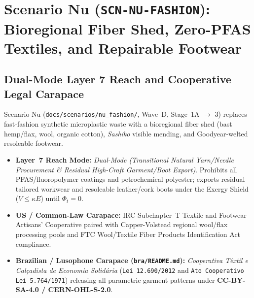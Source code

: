 \chapter{Scenario Nu (\texttt{SCN-NU-FASHION}): Bioregional Fiber Shed, Zero-PFAS Textiles, and Repairable Footwear}
\label{app:scenario-nu}

\section{Dual-Mode Layer 7 Reach and Cooperative Legal Carapace}
Scenario Nu (\texttt{docs/scenarios/nu\_fashion/}, Wave~D, Stage~1A $\to$ 3) replaces fast-fashion synthetic microplastic waste with a bioregional fiber shed (bast hemp/flax, wool, organic cotton), \textit{Sashiko} visible mending, and Goodyear-welted resoleable footwear.
\begin{itemize}
    \item \textbf{Layer~7 Reach Mode:} \textit{Dual-Mode (Transitional Natural Yarn/Needle Procurement \& Residual High-Craft Garment/Boot Export)}. Prohibits all PFAS/fluoropolymer coatings and petrochemical polyester; exports residual tailored workwear and resoleable leather/cork boots under the Exergy Shield ($V \le \kappa E$) until $\Phi_t = 0$.
    \item \textbf{US / Common-Law Carapace:} IRC Subchapter~T Textile and Footwear Artisans' Cooperative paired with Capper-Volstead regional wool/flax processing pools and FTC Wool/Textile Fiber Products Identification Act compliance.
    \item \textbf{Brazilian / Lusophone Carapace (\texttt{bra/README.md}):} \textit{Cooperativa T{\^e}xtil e Cal{\c{c}}adista de Economia Solid{\'a}ria} (\texttt{Lei 12.690/2012} and \texttt{Ato Cooperativo Lei 5.764/1971}) releasing all parametric garment patterns under \textbf{CC-BY-SA-4.0 / CERN-OHL-S-2.0}.
\end{itemize}

